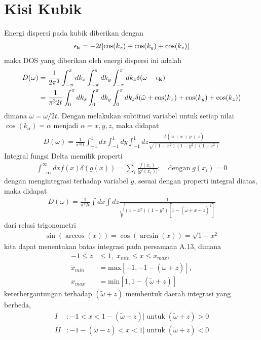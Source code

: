 \section{Kisi Kubik}

Energi dispersi pada kubik diberikan dengan
\begin{align}
\epsilon_{\textbf{k}} = -2t[\cos(k_x) + \cos(k_y) + \cos(k_z)]
\end{align}
maka DOS yang diberikan oleh energi dispersi ini adalah
\begin{align}
D(\omega	) &= \frac{1}{2\pi^3} \int_{-\pi}^\pi dk_x \int_{-\pi}^\pi dk_y \int_{-\pi}^\pi dk_z \delta(\omega - \epsilon_{\textbf{k}})\\
&= \frac{1}{\pi^3 2t}\int_0^\pi dk_x \int_0^\pi dk_y \int_0^\pi dk_z  \delta(\tilde{\omega} + \cos(k_x) + \cos(k_y) + \cos(k_z))
\end{align}
dimana $\tilde{\omega} = \omega / 2t$. Dengan melakukan subtitusi variabel untuk setiap nilai $\cos(k_\alpha) = \alpha$ menjadi $\alpha = x,y,z$, maka didapat
\begin{align}
D(\omega) = \frac{1}{\pi^32t}\int_{-1}^{1} dx \int_{-1}^{1} dy \int_{-1}^{1} dz \frac{\delta(\tilde{\omega} + x + y + z)}{\sqrt{(1-x^2)(1-y^2)(1-z^2)}}
\end{align}
Integral fungsi Delta memilik properti
\begin{align}
\int_{-\infty}^\infty dx f(x) \delta(g(x)) = \sum_i \frac{f(x_i)}{\vert g'(x_i) \vert}; \quad \text{dengan} \; g(x_i) = 0
\end{align}
dengan mengintegrasi terhadap variabel $y$, sesuai dengan properti integral diatas, maka didapat
\begin{align}
D(\omega) = \frac{1}{\pi^3 2t}\int dx \int dz \frac{1}{\sqrt{(1-x^2)(1-y^2)[1-(\tilde{\omega} + x + z)^2]}}
\end{align}
dari relasi trigonometri
\begin{align}
\sin(\arccos(x)) = \cos(\arcsin(x)) = \sqrt{1 - x^2}
\end{align}
kita dapat menentukan batas integrasi pada persamaan A.13, dimana
\begin{align}
-1 \leq z &\leq 1, \; x_{min} \leq x \leq x_{max},\\
x_{min} &= \text{max}[-1,-1-(\tilde{\omega}+z)],\\
x_{max} &= \text{min}[1,1-(\tilde{\omega} + z)]
\end{align}
keterbergantungan terhadap $(\tilde{\omega} + z)$ membentuk daerah integrasi yang berbeda,
\begin{align}
I &: -1 < x < 1 - (\tilde{\omega} - z) | \; \text{untuk} \; (\tilde{\omega} + z) > 0 \\
II &: -1 - (\tilde{\omega} - z) < x < 1 | \; \text{untuk} \; (\tilde{\omega} + z) < 0
\end{align}

